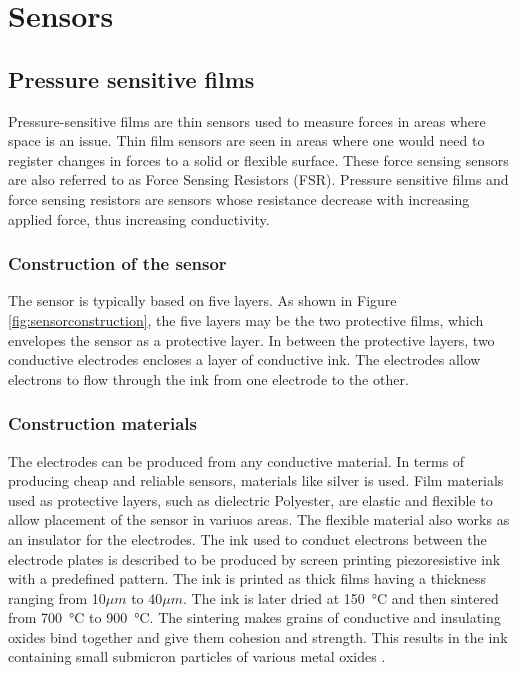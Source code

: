 \chapter{Sensors}
\label{chap:sensors}
\section{Pressure sensitive films}
Pressure-sensitive films are thin sensors used to measure forces in areas where space is an issue. Thin film sensors are seen in areas where one would need to register changes in forces to a solid or flexible surface. These force sensing sensors are also referred to as Force Sensing Resistors (FSR). Pressure sensitive films and force sensing resistors are sensors whose resistance decrease with increasing applied force, thus increasing conductivity.

\subsection{Construction of the sensor}
The sensor is typically based on five layers. As shown in Figure \ref{fig:sensorconstruction}, the five layers may be the two protective films, which envelopes the sensor as a protective layer. In between the protective layers, two conductive electrodes encloses a layer of conductive ink. The electrodes allow electrons to flow through the ink from one electrode to the other.

\subsection{Construction materials}
\label{subsec:materials}
The electrodes can be produced from any conductive material. In terms of producing cheap and reliable sensors, materials like silver is used. Film materials used as protective layers, such as dielectric Polyester, are elastic and flexible to allow placement of the sensor in variuos areas. The flexible material also works as an insulator for the electrodes. The ink used to conduct electrons between the electrode plates is described to be produced by screen printing piezoresistive ink with a predefined pattern. The ink is printed as thick films having a thickness ranging from 10$\mu m$ to 40$\mu m$. The ink is later dried at \SI{150}{\celsius} and then sintered from \SI{700}{\celsius} to \SI{900}{\celsius}. The sintering makes grains of conductive and insulating oxides bind together and give them cohesion and strength. This results in the ink containing small submicron particles of various metal oxides \citep[10.3, p.418]{handbook}.

